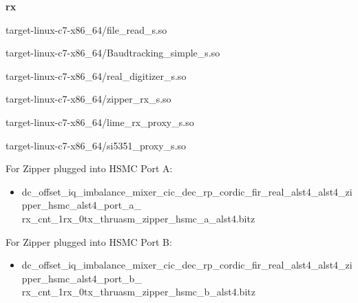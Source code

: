 	\noindent\textbf{rx}
	\begin{itemize}
	\begin{minipage}[t]{.5\textwidth}
	\item target-linux-c7-x86\_64/file\_read\_s.so
	\item target-linux-c7-x86\_64/Baudtracking\_simple\_s.so
	\item target-linux-c7-x86\_64/real\_digitizer\_s.so
	\end{minipage}
	\begin{minipage}[t]{.5\textwidth}
	\item target-linux-c7-x86\_64/zipper\_rx\_s.so
	\item target-linux-c7-x86\_64/lime\_rx\_proxy\_s.so
	\item target-linux-c7-x86\_64/si5351\_proxy\_s.so
	\end{minipage}
	\end{itemize}
	For Zipper plugged into HSMC Port A:
	\begin{itemize}
	\item dc\_offset\_iq\_imbalance\_mixer\_cic\_dec\_rp\_cordic\_fir\_real\_alst4\_alst4\_zipper\_hsmc\_alst4\_port\_a\_ \\
		rx\_cnt\_1rx\_0tx\_thruasm\_zipper\_hsmc\_a\_alst4.bitz
	\end{itemize}
	For Zipper plugged into HSMC Port B:
	\begin{itemize}
	\item dc\_offset\_iq\_imbalance\_mixer\_cic\_dec\_rp\_cordic\_fir\_real\_alst4\_alst4\_zipper\_hsmc\_alst4\_port\_b\_ \\
		rx\_cnt\_1rx\_0tx\_thruasm\_zipper\_hsmc\_b\_alst4.bitz		
	\end{itemize}

